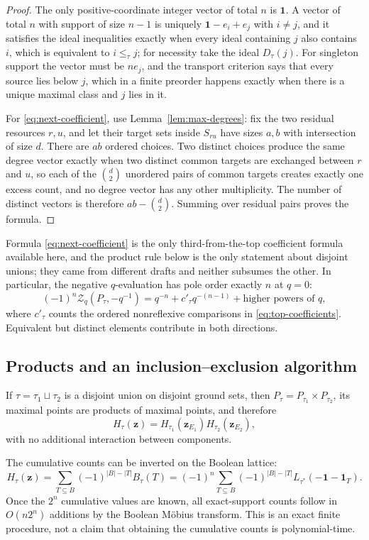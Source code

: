 \documentclass[11pt]{article}
\numberwithin{equation}{section}
\theoremstyle{definition}
\theoremstyle{remark}
\newcommand{\one}{\mathbf 1}
\newcommand{\Zeta}{\mathcal Z}
\newcommand{\zt}[1]{\mathbf z^{#1}}
\begin{document}
\begin{proof}
The only positive-coordinate integer vector of total $n$ is $\one$. A vector
of total $n$ with support of size $n-1$ is uniquely $\one-e_i+e_j$ with $i\ne
j$, and it satisfies the ideal inequalities exactly when every ideal
containing $j$ also contains $i$, which is equivalent to $i\le_\tau j$; for
necessity take the ideal $D_\tau(j)$. For singleton support the vector must be
$ne_j$, and the transport criterion says that every source lies below $j$,
which in a finite preorder happens exactly when there is a unique maximal
class and $j$ lies in it.

For \eqref{eq:next-coefficient}, use Lemma~\ref{lem:max-degrees}: fix the two
residual resources $r,u$, and let their target sets inside $S_{ru}$ have sizes
$a,b$ with intersection of size $d$. There are $ab$ ordered choices. Two
distinct choices produce the same degree vector exactly when two distinct
common targets are exchanged between $r$ and $u$, so each of the $\binom d2$
unordered pairs of common targets creates exactly one excess count, and no
degree vector has any other multiplicity. The number of distinct vectors is
therefore $ab-\binom d2$. Summing over residual pairs proves the formula.
\end{proof}

Formula \eqref{eq:next-coefficient} is the only third-from-the-top
coefficient formula available here, and the product rule below is the only
statement about disjoint unions; they came from different drafts and neither
subsumes the other. In particular, the negative $q$-evaluation has pole order
exactly $n$ at $q=0$:
\[
 (-1)^n\Zeta_q(P_\tau,-q^{-1})
 =q^{-n}+c'_\tau q^{-(n-1)}+\text{higher powers of }q,
\]
where $c'_\tau$ counts the ordered nonreflexive comparisons in
\eqref{eq:top-coefficients}. Equivalent but distinct elements contribute in
both directions.

\subsection{Products and an inclusion--exclusion algorithm}

If $\tau=\tau_1\sqcup\tau_2$ is a disjoint union on disjoint ground sets, then
$P_\tau=P_{\tau_1}\times P_{\tau_2}$, its maximal points are products of
maximal points, and therefore
\[
 H_\tau(\mathbf z)=H_{\tau_1}(\mathbf z_{E_1})H_{\tau_2}(\mathbf z_{E_2}),
\]
with no additional interaction between components.

The cumulative counts can be inverted on the Boolean lattice:
\begin{equation}
 [\zt B]H_\tau(\mathbf z)
 =\sum_{T\subseteq B}(-1)^{|B|-|T|}B_\tau(T)
 =(-1)^n\sum_{T\subseteq B}(-1)^{|B|-|T|}L_{\tau^*}(-\one-\one_T).
 \label{eq:support-inversion}
\end{equation}
Once the $2^n$ cumulative values are known, all exact-support counts follow in
$O(n2^n)$ additions by the Boolean M\"obius transform. This is an exact finite
procedure, not a claim that obtaining the cumulative counts is
polynomial-time.
\end{document}
